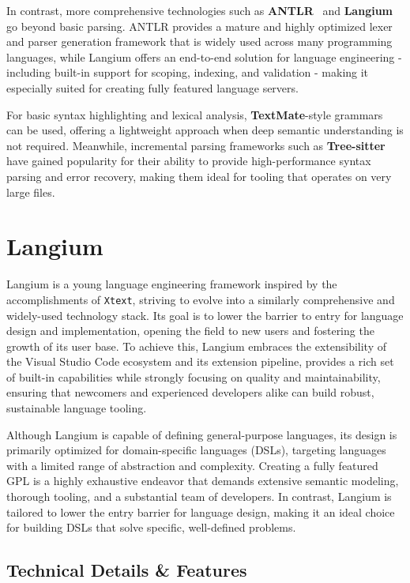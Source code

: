 In contrast, more comprehensive technologies such as \textbf{ANTLR}~\cite{ANTLR} and \textbf{Langium} go beyond
basic parsing. ANTLR provides a mature and highly optimized lexer and parser generation framework that is widely used across many programming languages, while Langium offers
an end-to-end solution for language engineering - including built-in support for scoping, indexing, and validation - making it especially suited for creating fully
featured language servers.

For basic syntax highlighting and lexical analysis, \textbf{TextMate}-style grammars~\cite{TextMate} can be used, offering a lightweight approach when deep semantic understanding is not required.
Meanwhile, incremental parsing frameworks such as \textbf{Tree-sitter}~\cite{Treesitter} have gained popularity for their ability to provide high-performance syntax parsing and error recovery,
making them ideal for tooling that operates on very large files.

\chapter{Langium}

Langium is a young language engineering framework inspired by the accomplishments of \verb|Xtext|, striving to evolve into a similarly comprehensive and widely-used technology stack.\cite{LangiumWeb}
Its goal is to lower the barrier to entry for language design and implementation, opening the field to new users and fostering the growth of its user base.
To achieve this, Langium embraces the extensibility of the Visual Studio Code ecosystem and its extension pipeline, provides a rich set of built-in
capabilities while strongly focusing on quality and maintainability, ensuring that newcomers and experienced developers alike can build robust, sustainable language tooling.

Although Langium is capable of defining general-purpose languages, its design is primarily optimized for domain-specific languages (DSLs), targeting languages with a limited range of abstraction and complexity.
Creating a fully featured GPL is a highly exhaustive endeavor that demands extensive semantic modeling, thorough tooling, and a substantial team of developers.
In contrast, Langium is tailored to lower the entry barrier for language design, making it an ideal choice for building DSLs that solve specific, well-defined problems.
\\

\section*{Technical Details \& Features}


